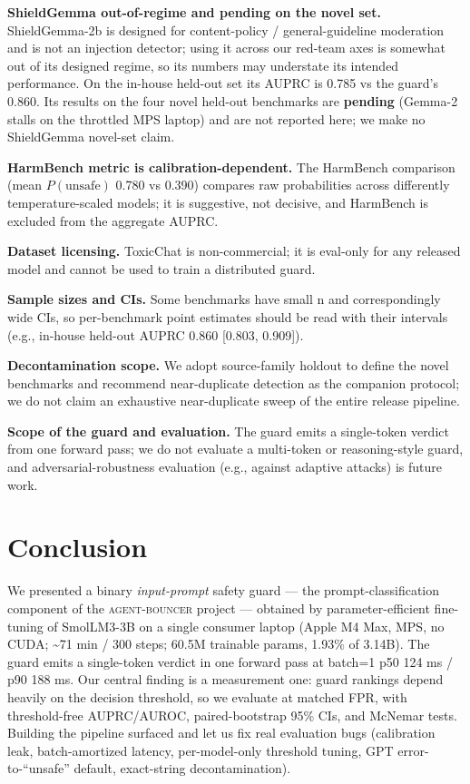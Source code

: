 \documentclass[sigconf,nonacm]{acmart}
\begin{document}
\textbf{ShieldGemma out-of-regime and pending on the novel set.} ShieldGemma-2b is designed for content-policy / general-guideline moderation and is not an injection detector; using it across our red-team axes is somewhat out of its designed regime, so its numbers may understate its intended performance. On the in-house held-out set its AUPRC is 0.785 vs the guard's 0.860. Its results on the four novel held-out benchmarks are \textbf{pending} (Gemma-2 stalls on the throttled MPS laptop) and are not reported here; we make no ShieldGemma novel-set claim.

\textbf{HarmBench metric is calibration-dependent.} The HarmBench comparison (mean $P(\text{unsafe})$ 0.780 vs 0.390) compares raw probabilities across differently temperature-scaled models; it is suggestive, not decisive, and HarmBench is excluded from the aggregate AUPRC.

\textbf{Dataset licensing.} ToxicChat is non-commercial; it is eval-only for any released model and cannot be used to train a distributed guard.

\textbf{Sample sizes and CIs.} Some benchmarks have small n and correspondingly wide CIs, so per-benchmark point estimates should be read with their intervals (e.g., in-house held-out AUPRC 0.860 [0.803, 0.909]).

\textbf{Decontamination scope.} We adopt source-family holdout to define the novel benchmarks and recommend near-duplicate detection as the companion protocol; we do not claim an exhaustive near-duplicate sweep of the entire release pipeline.

\textbf{Scope of the guard and evaluation.} The guard emits a single-token verdict from one forward pass; we do not evaluate a multi-token or reasoning-style guard, and adversarial-robustness evaluation (e.g., against adaptive attacks) is future work.

\section{Conclusion}

We presented a binary \emph{input-prompt} safety guard --- the prompt-classification component of the \textsc{agent-bouncer} project --- obtained by parameter-efficient fine-tuning of SmolLM3-3B on a single consumer laptop (Apple M4 Max, MPS, no CUDA; \textasciitilde{}71 min / 300 steps; 60.5M trainable params, 1.93\% of 3.14B). The guard emits a single-token verdict in one forward pass at batch=1 p50 124 ms / p90 188 ms. Our central finding is a measurement one: guard rankings depend heavily on the decision threshold, so we evaluate at matched FPR, with threshold-free AUPRC/AUROC, paired-bootstrap 95\% CIs, and McNemar tests. Building the pipeline surfaced and let us fix real evaluation bugs (calibration leak, batch-amortized latency, per-model-only threshold tuning, GPT error-to-``unsafe'' default, exact-string decontamination).
\end{document}

